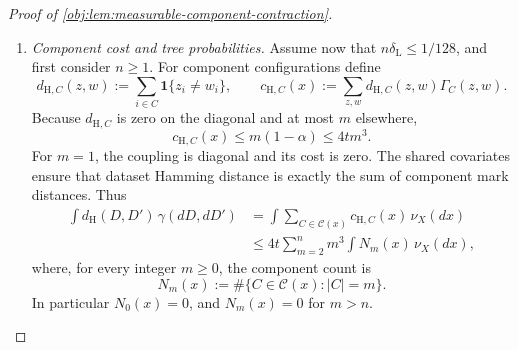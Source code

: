 \documentclass[11pt]{article}
\begin{document}
\begin{proof}[Proof of \cref{obj:lem:measurable-component-contraction}]
\begin{enumerate}
The component marginal identities and factorization give, for every \(x,z,w\),
\[
\begin{aligned}
\sum_w p_{\mathrm{joint}}(x,z,w)
&=\prod_{C\in\mathscr C(x)}Q_C(\{z|_C\})\\
&=E_\lambda\prod_{i=1}^n
 \frac{L_\lambda(x_i,U_i(z),V_{Y,i}(z))}{4},
\end{aligned}
\qquad
\sum_zp_{\mathrm{joint}}(x,z,w)=4^{-n}.
\]
In particular, \(\gamma_x\) is a probability measure.

Define the shared covariate law and integrated coupling by
\[
\nu_X:=\bigotimes_{i=1}^n\operatorname{Unif}[0,1],
\qquad
\gamma(\mathcal E)
:=
\int_{[0,1]^n}\gamma_x(\mathcal E)\,\nu_X(dx)
\]
for every measurable dataset-pair event \(\mathcal E\).
The alternatives and null have this common covariate law. Integrating the first conditional marginal and interchanging the finite sign average with the integral yields the uniform mixture of alternative product laws; integrating the second yields the fair-null product law. Explicitly, with
\[
\operatorname{pr}_1(D,D')=D,
\qquad
\operatorname{pr}_2(D,D')=D',
\]
we obtain
\[
(\operatorname{pr}_1)_\#\gamma=Q_n,
\qquad
(\operatorname{pr}_2)_\#\gamma=(P_0^{\mathrm{obs}})^{\otimes n},
\qquad
\gamma(\mathcal O^n\times\mathcal O^n)=1.
\]
For \(n=0\), the mark space and dataset space each have one element; the empty component product gives the unit mass on the pair of empty datasets.

\item \textit{Component cost and tree probabilities.}
Assume now that \(n\delta_{\mathrm L}\le1/128\), and first consider \(n\ge1\). For component configurations define
\[
d_{\mathrm H,C}(z,w)
:=\sum_{i\in C}\mathbf 1\{z_i\ne w_i\},
\qquad
c_{\mathrm H,C}(x)
:=\sum_{z,w}d_{\mathrm H,C}(z,w)\Gamma_C(z,w).
\]
Because \(d_{\mathrm H,C}\) is zero on the diagonal and at most \(m\) elsewhere,
\[
c_{\mathrm H,C}(x)
\le m(1-\alpha)
\le4tm^3.
\]
For \(m=1\), the coupling is diagonal and its cost is zero. The shared covariates ensure that dataset Hamming distance is exactly the sum of component mark distances. Thus
\[
\begin{aligned}
\int d_{\mathrm H}(D,D')\,\gamma(dD,dD')
&=\int\sum_{C\in\mathscr C(x)}c_{\mathrm H,C}(x)\,\nu_X(dx)\\
&\le4t\sum_{m=2}^n m^3\int N_m(x)\,\nu_X(dx),
\end{aligned}
\]
where, for every integer \(m\ge0\), the component count is
\[
N_m(x)
:=\#\{C\in\mathscr C(x):|C|=m\}.
\]
In particular \(N_0(x)=0\), and \(N_m(x)=0\) for \(m>n\).


\end{enumerate}
\end{proof}
\end{document}
